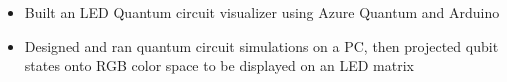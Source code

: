 
\begin{itemize}
    \item Built an LED Quantum circuit visualizer using Azure Quantum and Arduino
    \item Designed and ran quantum circuit simulations on a PC, then projected qubit states onto RGB color space to be displayed on an LED matrix
\end{itemize}
